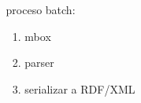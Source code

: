 \documentclass[spanish,notes=hide]{beamer}
\begin{document}
{\begin{columns}
\begin{column}{0.5\textwidth}
\begin{center}
	\end{center}
   \end{column}
   \begin{column}{0.5\textwidth}
	\begin{Large}proceso batch:\end{Large}
	\begin{enumerate}
	 \item<2-> mbox
	 \item<3-> parser
	 \item<4-> serializar a RDF/XML 
	\end{enumerate}
   \end{column}
  \end{columns}
}
\end{document}
